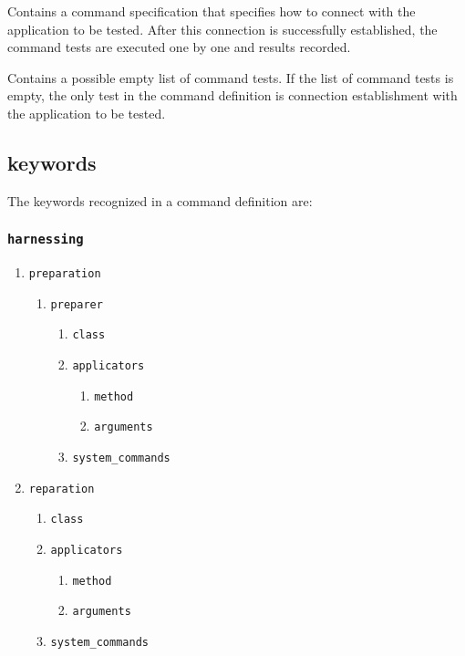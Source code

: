 \documentclass[11pt]{article}
\begin{document}
Contains a command specification that specifies how to connect with
the application to be tested.  After this connection is successfully
established, the command tests are executed one by one and results
recorded.

Contains a possible empty list of command tests.  If the list of
command tests is empty, the only test in the command definition is
connection establishment with the application to be tested.

\subsection{keywords}
\label{sec-3-1}
The keywords recognized in a command definition are:
\subsubsection{\texttt{harnessing}}
\label{sec-3-1-1}
\begin{enumerate}
\item \texttt{preparation}
\label{sec-3-1-1-1}
\begin{enumerate}
\item \texttt{preparer}
\label{sec-3-1-1-1-1}
\begin{enumerate}
\item \texttt{class}
\label{sec-3-1-1-1-1-1}
\item \texttt{applicators}
\label{sec-3-1-1-1-1-2}
\begin{enumerate}
\item \texttt{method}
\label{sec-3-1-1-1-1-2-1}
\item \texttt{arguments}
\label{sec-3-1-1-1-1-2-2}
\end{enumerate}
\item \texttt{system\_commands}
\label{sec-3-1-1-1-1-3}
\end{enumerate}
\end{enumerate}

\item \texttt{reparation}
\label{sec-3-1-1-2}
\begin{enumerate}
\item \texttt{class}
\label{sec-3-1-1-2-0-1}
\item \texttt{applicators}
\label{sec-3-1-1-2-0-2}
\begin{enumerate}
\item \texttt{method}
\label{sec-3-1-1-2-0-2-1}
\item \texttt{arguments}
\label{sec-3-1-1-2-0-2-2}
\end{enumerate}
\item \texttt{system\_commands}
\label{sec-3-1-1-2-0-3}
\end{enumerate}
\end{enumerate}
\end{document}
